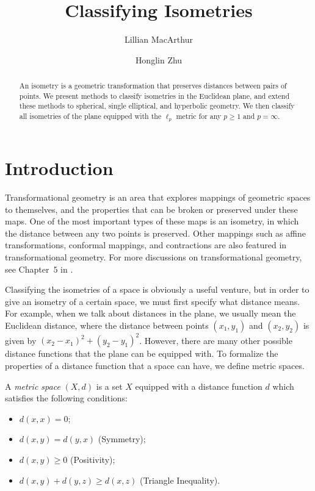 \documentclass{mystyle}
\title[Classifying Isometries]{Classifying Isometries}
\author{Lillian MacArthur}
\author{Honglin Zhu}
\begin{document}
\begin{abstract}
An isometry is a geometric transformation that preserves distances between pairs of points. We present methods to classify isometries in the Euclidean plane, and extend these methods to spherical, single elliptical, and hyperbolic geometry. We then classify all isometries of the plane equipped with the $\ell_p$ metric for any $p \geq 1$ and $p = \infty$.
\end{abstract}

\maketitle

\section{Introduction}
Transformational geometry is an area that explores mappings of geometric spaces to themselves, and the properties that can be broken or preserved under these maps. One of the most important types of these maps is an isometry, in which the distance between any two points is preserved. Other mappings such as affine transformations, conformal mappings, and contractions are also featured in transformational geometry. For more discussions on transformational geometry, see Chapter~$5$ in \cite{sibley2015}. 

Classifying the isometries of a space is obviously a useful venture, but in order to give an isometry of a certain space, we must first specify what distance means. For example, when we talk about distances in the plane, we usually mean the Euclidean distance, where the distance between points $(x_1, y_1)$ and $(x_2, y_2)$ is given by $(x_2-x_1)^2+(y_2-y_1)^2$. However, there are many other possible distance functions that the plane can be equipped with. To formalize the properties of a distance function that a space can have, we define metric spaces. 

\begin{definition}
    A \textit{metric space} $(X, d)$ is a set $X$ equipped with a distance function $d$ which satisfies the following conditions:
    \begin{itemize}
        \item $d(x,x) = 0$;
        \item  $d(x,y) = d(y,x)$ (Symmetry);
        \item  $d(x,y) \ge 0$ (Positivity);
        \item  $d(x,y) + d(y,z) \ge d(x,z)$ (Triangle Inequality).
    \end{itemize}
\end{definition}
\end{document}
